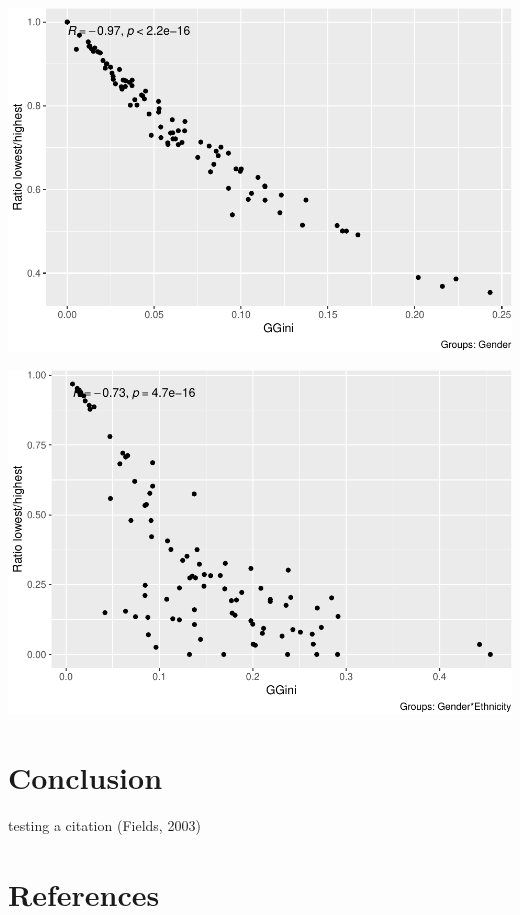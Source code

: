 \documentclass[
  11pt,
a4paper
]{article}
\begin{document}
\includegraphics{horizontal_inequality_files/figure-latex/unnamed-chunk-1-1}

\includegraphics{horizontal_inequality_files/figure-latex/gender-cor-1}

\hypertarget{conclusion}{%
\section{Conclusion}\label{conclusion}}

testing a citation (Fields, 2003)

\clearpage

\hypertarget{references}{%
\section*{References}\label{references}}
\end{document}

